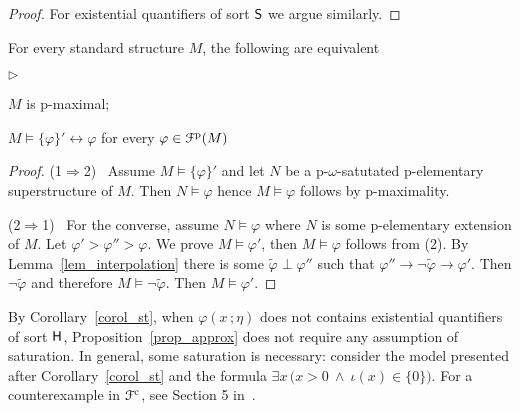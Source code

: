 \documentclass{amsproc}
\newcommand{\mylabel}[1]{{#1}\hfill}
\renewenvironment{itemize}
  {\begin{list}{$\triangleright$}{%
  \setlength{\parskip}{0mm}
  \setlength{\topsep}{.4\baselineskip}
  \setlength{\rightmargin}{0mm}
  \setlength{\listparindent}{0mm}
  \setlength{\itemindent}{0mm}
  \setlength{\labelwidth}{3ex}
  \setlength{\itemsep}{.2\baselineskip}
  \setlength{\parsep}{.2\baselineskip}
  \setlength{\partopsep}{0mm}
  \setlength{\labelsep}{1ex}
  \setlength{\leftmargin}{\labelwidth+\labelsep}
  \let\makelabel\mylabel}}{%
\end{list}}
\begin{document}
\begin{proof}
For existential quantifiers of sort ${\sf S}$ we argue similarly.%
%
%
%
%
%
\end{proof}


\begin{corollary}\label{corol_pmax}
  For every standard structure $M$, the following are equivalent
  \begin{itemize}
    \item[1.] $M$ is p-maximal;
    \item[2.] $M\models\{\varphi\}'\leftrightarrow\varphi$ for every $\varphi\in{\EuScript F}^{\rm p}(M)$ 
  \end{itemize}
\end{corollary}
\begin{proof}
(1$\Rightarrow$2) \ 
Assume $M\models\{\varphi\}'$ and let $N$ be a p-$\omega$-satutated p-elementary superstructure of $M$.
Then $N\models\varphi$ hence $M\models\varphi$ follows by p-maximality.

(2$\Rightarrow$1) \ 
For the converse, assume $N\models\varphi$ where $N$ is some p-elementary extension of $M$.
Let $\varphi'>\varphi''>\varphi$.
We prove $M\models\varphi'$, then $M\models\varphi$ follows from (2).
By Lemma~\ref{lem_interpolation} there is some $\tilde\varphi\perp\varphi''$ such that $\varphi''\rightarrow\neg\tilde\varphi\rightarrow\varphi'$.
Then $\neg\tilde\varphi$ and therefore  $M\models\neg\tilde\varphi$.
Then $M\models\varphi'$.
\end{proof}

\def\ceq#1#2#3{\parbox[t]{20ex}{$\displaystyle #1$}\parbox[t]{6ex}{\hfil $#2$}{$\displaystyle #3$}}

\begin{remark}\label{remk_approx_EH_free}
  By Corollary~\ref{corol_st}, when $\varphi(x\,;\eta)$ does not contains existential quantifiers of sort ${\sf H}$, Proposition~\ref{prop_approx} does not require any assumption of saturation.
  In general, some saturation is necessary: consider the model presented after Corollary~\ref{corol_st} and the formula $\exists x\,\big(x>0\ \wedge\ \iota(x)\in\{0\}\big)$.
  For a counterexample in ${\EuScript F}^{\rm c}$, see Section 5 in~\cite{HI}.
\end{remark}
\end{document}
